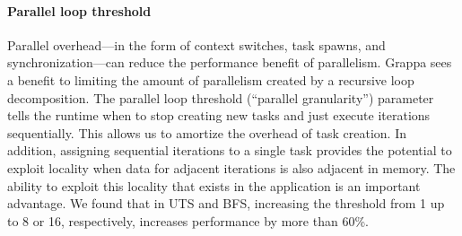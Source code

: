 




\paragraph{Parallel loop threshold}


Parallel overhead---in the form of context switches, task spawns, and
synchronization---can reduce the performance benefit of parallelism.
Grappa sees a benefit to limiting the amount of parallelism created by
a recursive loop decomposition. The parallel loop threshold (``parallel
granularity'') parameter tells the runtime when to stop creating new tasks and just execute iterations
sequentially. This allows us to amortize the overhead of task
creation. In addition, assigning sequential iterations to a single
task provides the potential to exploit locality when data for adjacent iterations is
also adjacent in memory. The ability to exploit this locality that
exists in the application is an important advantage. We found that in UTS and BFS, increasing the
threshold from 1 up to 8 or 16, respectively, increases performance by
more than 60\%.



